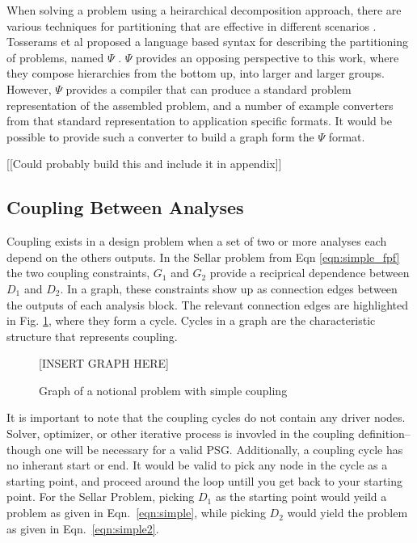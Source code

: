   When solving a problem using a heirarchical decomposition approach, 
  there are various techniques for partitioning that are effective in different 
  scenarios \cite{krishnamachari1997optimal,michelena1997hypergraph,
  sobieszczanski1997,Perez2004,allison2009optimal}. Tosserams et al proposed a 
  language based syntax for describing the partitioning of problems, named $\Psi$
  \cite{tosserams2010specification}. $\Psi$ provides an opposing perspective to 
  this work, where they compose hierarchies from the bottom up, into larger and 
  larger groups. However, $\Psi$ provides a compiler that can produce a standard 
  problem representation of the assembled problem, and a number of example converters
  from that standard representation to application specific formats. It would be 
  possible to provide such a converter to build a graph form the $\Psi$ format.

  [[Could probably build this and include it in appendix]] 


\subsection{Coupling Between Analyses}

  Coupling exists in a design problem when a set of two or more analyses each depend on the
  others outputs. In the Sellar problem from Eqn \ref{eqn:simple_fpf} the two 
  coupling constraints, $G_1$ and $G_2$ provide a reciprical dependence between 
  $D_1$ and $D_2$. In a graph, these constraints show up as connection edges between 
  the outputs of each analysis block. The relevant connection edges are highlighted in 
  Fig. \ref{f:coupling}, where they form a cycle. Cycles in a graph are the characteristic 
  structure that represents coupling. 

  \begin{figure}
      \begin{center}
      [INSERT GRAPH HERE]
      \caption{Graph of a notional problem with simple coupling \label{f:coupling}}
      \end{center}
  \end{figure}

	It is important to note that the coupling cycles do not contain 
	any driver nodes. Solver, optimizer, or other iterative process is 
	invovled in the coupling definition--though one will be necessary for a valid 
  PSG. Additionally, a coupling cycle has no inherant start or end. It would be
  valid to pick any node in the cycle as a starting point, and proceed around the
  loop untill you get back to your starting point. For the Sellar Problem, picking 
  $D_1$ as the starting point would yeild a problem as given in 
	Eqn.~\ref{eqn:simple}, while picking $D_2$ would yield the problem as given in 
  Eqn.~\ref{eqn:simple2}.

